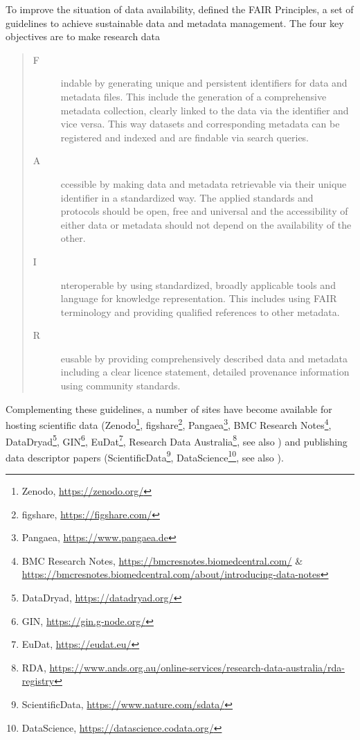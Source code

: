 To improve the situation of data availability, \citet{Wilkinson_2016} defined the FAIR Principles, a set of guidelines to achieve sustainable data and metadata management. The four key objectives are to make research data
\begin{quote}
\begin{description}
 \item[F]indable by generating unique and persistent identifiers for data and metadata files. This include the generation of a comprehensive metadata collection, clearly linked to the data via the identifier and vice versa. This way datasets and corresponding metadata can be registered and indexed and are findable via search queries.
 \item[A]ccessible by making data and metadata retrievable via their unique identifier in a standardized way. The applied standards and protocols should be open, free and universal and the accessibility of either data or metadata should not depend on the availability of the other. 
 \item[I]nteroperable by using standardized, broadly applicable tools and language for knowledge representation. This includes using FAIR terminology and providing qualified references to other metadata.
 \item[R]eusable by providing comprehensively described data and metadata including a clear licence statement, detailed provenance information using community standards. 
\end{description}
\end{quote}
 Complementing these guidelines, a number of sites have become available for hosting scientific data (Zenodo\footnote{Zenodo, \url{https://zenodo.org/}}, figshare\footnote{figshare, \url{https://figshare.com/}}, Pangaea\footnote{Pangaea, \url{https://www.pangaea.de}}, BMC Research Notes\footnote{BMC Research Notes, \url{https://bmcresnotes.biomedcentral.com/} \& \url{https://bmcresnotes.biomedcentral.com/about/introducing-data-notes}}, DataDryad\footnote{DataDryad, \url{https://datadryad.org/}}, GIN\footnote{GIN, \url{https://gin.g-node.org/}}, EuDat\footnote{EuDat, \url{https://eudat.eu/}}, Research Data Australia\footnote{RDA, \url{https://www.ands.org.au/online-services/research-data-australia/rda-registry}}, see also \citet{Assante_2016}) and publishing data descriptor papers (ScientificData\footnote{ScientificData, \url{https://www.nature.com/sdata/}}, DataScience\footnote{DataScience, \url{https://datascience.codata.org/}}, see also \citet{Candela_2015}).
